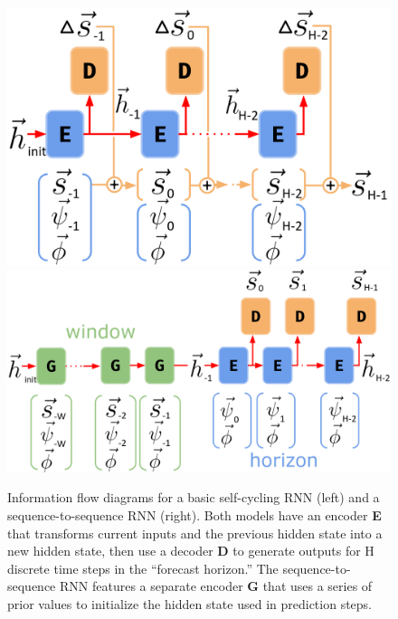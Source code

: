 \documentclass[11pt]{article}
\begin{document}
\begin{figure}[h!]
    \centering

    \includegraphics[width=.38\linewidth]{figs/abstract_scrnn.png}
    \hspace{3em}
    \includegraphics[width=.50\linewidth]{figs/abstract_rnn.png}

    \caption{Information flow diagrams for a basic self-cycling RNN (left) and a sequence-to-sequence RNN (right). Both models have an encoder \textbf{E} that transforms current inputs and the previous hidden state into a new hidden state, then use a decoder \textbf{D} to generate outputs for H discrete time steps in the ``forecast horizon.'' The sequence-to-sequence RNN features a separate encoder \textbf{G} that uses a series of prior values to initialize the hidden state used in prediction steps.}
    \label{rnns}
\end{figure}
\end{document}
